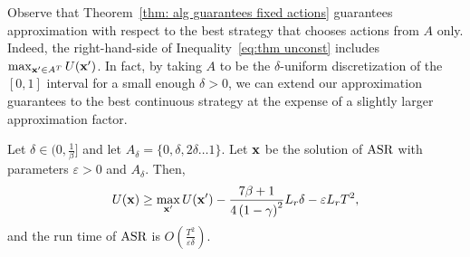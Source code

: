 Observe that Theorem~\ref{thm: alg guarantees fixed actions} guarantees approximation with respect to the best strategy that chooses actions from $A$ only. Indeed, the right-hand-side of Inequality~\eqref{eq:thm unconst} includes $\max_{{\bf{x'}} \in A^T}U({\bf{x}}')$. In fact, by taking $A$ to be the $\delta$-uniform discretization of the $[0,1]$ interval for a small enough $\delta>0$, we can extend our approximation guarantees to the best continuous strategy at the expense of a slightly larger approximation factor.
\begin{theorem} \label{thm: ASR alg optimal bound}
Let $\delta \in (0, \frac{1}{\beta}]$ and let $A_\delta = \{ 0, \delta, 2\delta \ldots 1 \}$. Let ${\bf{x}}$ be the solution of $\textnormal{ASR}$ with parameters $\varepsilon > 0$ and $A_\delta$. Then,
\begin{align*}
U({\bf{x}}) \geq \max_{{\bf{x}}'} U({\bf{x}}') - \frac{7\beta + 1}{4\left(1-\gamma \right)^2}  L_r \delta - \varepsilon L_r T^2,
\end{align*}
and the run time of $\textnormal{ASR}$ is $O\left(\frac{T^2}{\varepsilon \delta}\right)$.
\end{theorem}

